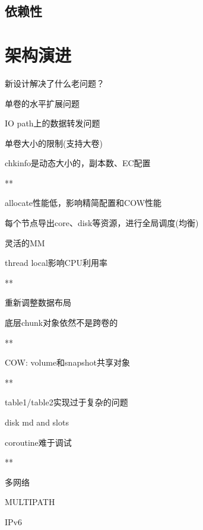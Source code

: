 

\subsection{依赖性}



\section{架构演进}


新设计解决了什么老问题？
\begin{enumbox}
\item 单卷的水平扩展问题
\item IO path上的数据转发问题
\item 单卷大小的限制(支持大卷)
\item chkinfo是动态大小的，副本数、EC配置
\item ***
\item allocate性能低，影响精简配置和COW性能
\item 每个节点导出core、disk等资源，进行全局调度(均衡)
\item 灵活的MM
\item thread local影响CPU利用率
\item ***
\item 重新调整数据布局
\item 底层chunk对象依然不是跨卷的
\item ***
\item COW: volume和snapshot共享对象
\item ***
\item table1/table2实现过于复杂的问题
\item disk md and slots
\item coroutine难于调试
\item ***
\item 多网络
\item MULTIPATH
\item IPv6
\end{enumbox}

